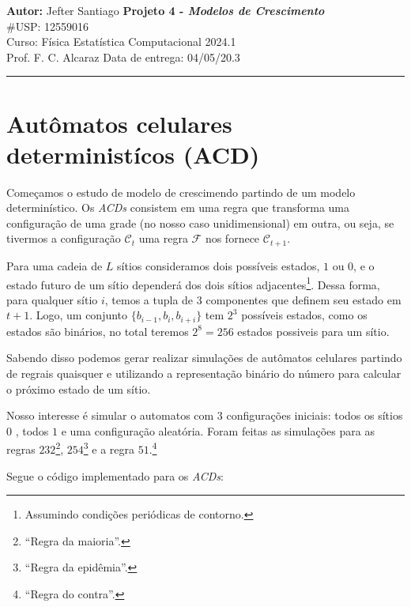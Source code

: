 \documentclass[a4paper, 11pt]{tufte-handout}
\begin{document}
\noindent
\large\textbf{Autor:} Jefter Santiago \hfill \textbf{Projeto 4 - {\color{blue}\emph{Modelos de Crescimento}}}   \\
\#USP: 12559016 \\
\normalsize Curso: Física Estatística Computacional \hfill 2024.1 \\
Prof. F. C. Alcaraz \hfill Data de entrega: 04/05/20.3 \\
\noindent\rule{7in}{2.8pt}


\section{Autômatos celulares deterministícos (ACD)}

Começamos o estudo de modelo de crescimendo partindo de um modelo determinístico. Os
\emph{ACDs} consistem em uma regra que transforma uma configuração de uma grade (no nosso
caso unidimensional) em outra, ou seja, se tivermos a configuração \( \mathcal{C}_{t}\) uma regra \( \mathcal{F}\)
nos fornece \( \mathcal{C}_{t + 1} \).

Para uma cadeia de \( L \) sítios consideramos dois possíveis estados, \( 1 \) ou \( 0 \), e o
estado futuro de um sítio dependerá dos dois sítios adjacentes\footnote{Assumindo condições
periódicas de contorno.}. Dessa forma, para qualquer sítio \( i \), temos a tupla de \( 3 \)
componentes que definem seu estado em \( t + 1 \). Logo, um conjunto \( \{ b_{i-1}, b_i, b_{i+i} \}
\) tem \( 2^3 \) possíveis estados, como os estados são binários, no total teremos \( 2^{8} = 256 \)
estados possiveis para um sítio.


Sabendo disso podemos gerar realizar simulações de autômatos celulares partindo de regrais quaisquer
e utilizando a representação binário do número para calcular o próximo estado de um sítio.



Nosso interesse é simular o automatos com 3 configurações iniciais: todos os sítios \( 0 \) , todos
\( 1 \) e uma configuração aleatória. Foram feitas as simulações para as regras $232$\footnote{``Regra
  da maioria''.}, \( 254 \)\footnote{``Regra da epidêmia''.} e a regra  $51$.\footnote{``Regra do contra''.}


Segue o código implementado para os \emph{ACDs}:
\end{document}

